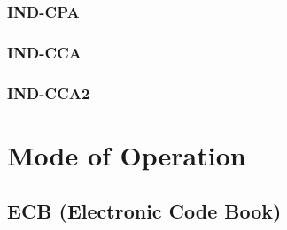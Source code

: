 \documentclass[12pt,openany]{book}
\theoremstyle{definition}
\begin{document}
	\subsection{IND-CPA}
	\subsection{IND-CCA}
	\subsection{IND-CCA2}
	
	\newpage
	\chapter{Mode of Operation}
	
	\section{ECB (Electronic Code Book)}
	
\end{document}
